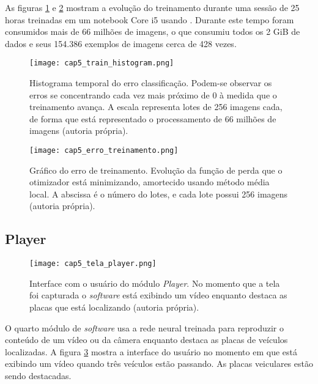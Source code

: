 As figuras \ref{fig:cap5_train_histogram} e \ref{fig:cap5_erro_treinamento}
mostram a evolução do treinamento durante uma sessão de 25
horas treinadas em um notebook Core i5 usando . Durante este tempo foram
consumidos mais de 66 milhões de imagens, o que consumiu todos os 2 GiB de
dados e seus 154.386 exemplos de imagens cerca de 428 vezes.

\begin{figure}[!htb]
	\centering
	\texttt{[image: cap5\_train\_histogram.png]}
	\caption[Histograma temporal do erro de classificação]{
		Histograma temporal do erro classificação.
		Podem-se observar os erros se concentrando cada vez mais próximo de 0 à
		medida que o treinamento avança. 
		A escala representa lotes de 256 imagens cada, de forma que está
		representado o processamento de 66 milhões de imagens (autoria
		própria).}
	\label{fig:cap5_train_histogram}
\end{figure}

\begin{figure}[!htb]
	\centering
	\texttt{[image: cap5\_erro\_treinamento.png]}
	\caption[Gráfico do erro de treinamento]{
		Gráfico do erro de treinamento.
		Evolução da função de perda que o otimizador está minimizando, amortecido
		usando método média local. A abscissa é o número do lotes, e cada lote
		possui 256 imagens (autoria própria).}
	\label{fig:cap5_erro_treinamento}
\end{figure}

\subsection{Player}

\begin{figure}[!htb]
	\centering
	\texttt{[image: cap5\_tela\_player.png]}
	\caption[Interface com o usuário do módulo \emph{Player}]{
		Interface com o usuário do módulo \emph{Player}.
		No momento que a tela foi capturada o \emph{software} está exibindo um
		vídeo enquanto destaca as placas que está localizando (autoria própria).}
	\label{fig:cap5_tela_player}
\end{figure}

O quarto módulo de \emph{software} usa a rede neural treinada para reproduzir o
conteúdo de um vídeo ou da câmera enquanto destaca as placas de veículos
localizadas. A figura \ref{fig:cap5_tela_player} mostra a interface do usuário
no momento em que está exibindo um vídeo quando três veículos estão passando.
As placas veiculares estão sendo destacadas.

